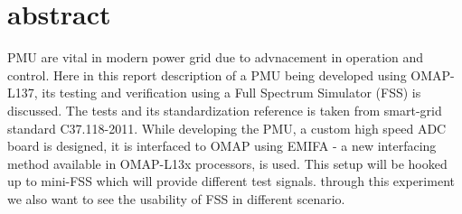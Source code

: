 \section{abstract}
PMU are vital in modern power grid due to advnacement in operation and control. Here in this report description of a PMU being developed using OMAP-L137, its testing and verification using a Full Spectrum Simulator (FSS) is discussed. The tests and its standardization reference is taken from smart-grid standard C37.118-2011. While developing the PMU, a custom high speed ADC board is designed, it is interfaced to OMAP using EMIFA - a new interfacing method available in OMAP-L13x processors, is used. This setup will be hooked up to mini-FSS which will provide different test signals. through this experiment we also want to see the usability of FSS in different scenario.